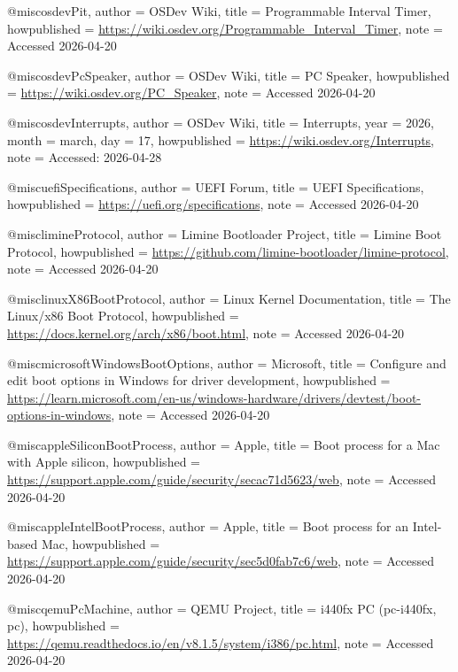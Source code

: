@misc{osdevPit,
  author       = {{OSDev Wiki}},
  title        = {{Programmable Interval Timer}},
  howpublished = {\url{https://wiki.osdev.org/Programmable_Interval_Timer}},
  note         = {Accessed 2026-04-20}
}

@misc{osdevPcSpeaker,
  author       = {{OSDev Wiki}},
  title        = {{PC Speaker}},
  howpublished = {\url{https://wiki.osdev.org/PC_Speaker}},
  note         = {Accessed 2026-04-20}
}

@misc{osdevInterrupts,
  author       = {{OSDev Wiki}},
  title        = {{Interrupts}},
  year         = {2026},
  month        = {march},
  day          = {17},
  howpublished = {\url{https://wiki.osdev.org/Interrupts}},
  note         = {Accessed: 2026-04-28}
}

@misc{uefiSpecifications,
  author       = {{UEFI Forum}},
  title        = {{UEFI Specifications}},
  howpublished = {\url{https://uefi.org/specifications}},
  note         = {Accessed 2026-04-20}
}

@misc{limineProtocol,
  author       = {{Limine Bootloader Project}},
  title        = {{Limine Boot Protocol}},
  howpublished = {\url{https://github.com/limine-bootloader/limine-protocol}},
  note         = {Accessed 2026-04-20}
}

@misc{linuxX86BootProtocol,
  author       = {{Linux Kernel Documentation}},
  title        = {{The Linux/x86 Boot Protocol}},
  howpublished = {\url{https://docs.kernel.org/arch/x86/boot.html}},
  note         = {Accessed 2026-04-20}
}

@misc{microsoftWindowsBootOptions,
  author       = {{Microsoft}},
  title        = {{Configure and edit boot options in Windows for driver development}},
  howpublished = {\url{https://learn.microsoft.com/en-us/windows-hardware/drivers/devtest/boot-options-in-windows}},
  note         = {Accessed 2026-04-20}
}

@misc{appleSiliconBootProcess,
  author       = {{Apple}},
  title        = {{Boot process for a Mac with Apple silicon}},
  howpublished = {\url{https://support.apple.com/guide/security/secac71d5623/web}},
  note         = {Accessed 2026-04-20}
}

@misc{appleIntelBootProcess,
  author       = {{Apple}},
  title        = {{Boot process for an Intel-based Mac}},
  howpublished = {\url{https://support.apple.com/guide/security/sec5d0fab7c6/web}},
  note         = {Accessed 2026-04-20}
}

@misc{qemuPcMachine,
  author       = {{QEMU Project}},
  title        = {{i440fx PC (pc-i440fx, pc)}},
  howpublished = {\url{https://qemu.readthedocs.io/en/v8.1.5/system/i386/pc.html}},
  note         = {Accessed 2026-04-20}
}

